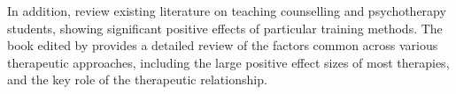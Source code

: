 \documentclass[prodmode,acmtochi]{acmsmall}
\newcommand{\Geraldine}[1]{\textrm{\textbf{\textcolor{Orange}{[[#1]]} } } }
\begin{document}
In addition,  review existing literature on teaching counselling and psychotherapy students, showing significant positive effects of particular training methods. The book edited by  provides a detailed review of the factors common across various therapeutic approaches, including the large positive effect sizes of most therapies, and the key role of the therapeutic relationship. 






\end{document}
